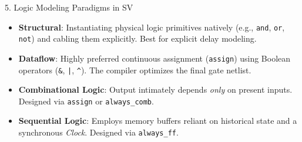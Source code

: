 \documentclass[aspectratio=169]{beamer}
\begin{document}
\begin{frame}{5. Logic Modeling Paradigms in SV}
\begin{itemize}
    \item \textbf{Structural}: Instantiating physical logic primitives natively (e.g., \texttt{and}, \texttt{or}, \texttt{not}) and cabling them explicitly. Best for explicit delay modeling.
    \item \textbf{Dataflow}: Highly preferred continuous assignment (\texttt{assign}) using Boolean operators (\texttt{\&}, \texttt{|}, \texttt{\^}). The compiler optimizes the final gate netlist.
    \vspace{0.3cm}
    \item \textbf{Combinational Logic}: Output intimately depends \textit{only} on present inputs. Designed via \texttt{assign} or \texttt{always\_comb}. 
    \item \textbf{Sequential Logic}: Employs memory buffers reliant on historical state and a synchronous \textit{Clock}. Designed via \texttt{always\_ff}.
\end{itemize}
\end{frame}
\end{document}

